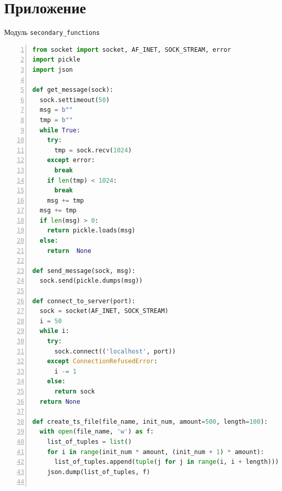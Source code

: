 \Conc

\printbibliography[heading=bibintoc]

\appendix
{}
\section*{Приложение}
\begin{ListingEnv}[H]\caption{Модуль \texttt{secondary\_functions}}\label{list:secfunc}
\begin{lstlisting}[language=Python, numbers=left]
from socket import socket, AF_INET, SOCK_STREAM, error
import pickle
import json

def get_message(sock):
  sock.settimeout(50)
  msg = b""
  tmp = b""
  while True:
	try:
	  tmp = sock.recv(1024)
	except error:
	  break
	if len(tmp) < 1024:
	  break
	msg += tmp
  msg += tmp
  if len(msg) > 0:
	return pickle.loads(msg)
  else:
	return  None

def send_message(sock, msg):
  sock.send(pickle.dumps(msg))

def connect_to_server(port):
  sock = socket(AF_INET, SOCK_STREAM)
  i = 50
  while i:
	try:
	  sock.connect(('localhost', port))
	except ConnectionRefusedError:
	  i -= 1
	else:
	  return sock
  return None

def create_ts_file(file_name, init_num, amount=500, length=100):
  with open(file_name, 'w') as f:
	list_of_tuples = list()
	for i in range(init_num * amount, (init_num + 1) * amount):
	  list_of_tuples.append(tuple(j for j in range(i, i + length)))
	json.dump(list_of_tuples, f)
	
	\end{lstlisting}
\end{ListingEnv}

